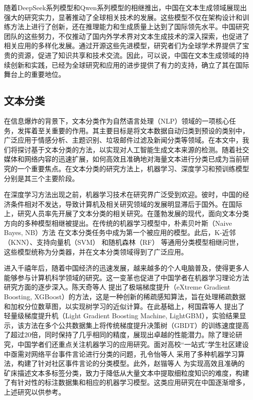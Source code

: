 随着DeepSeek系列模型和Qwen系列模型的相继推出，中国在文本生成领域展现出强大的研究实力，显著推动了全球相关技术的发展。这些模型不仅在架构设计和训练方法上进行了创新，还在推理能力和生成质量上达到了国际领先水平。中国研究团队的这些努力，不仅推动了国内外学术界对文本生成技术的深入探索，也促进了相关应用的多样化发展。通过开源这些先进模型，研究者们为全球学术界提供了宝贵的资源，促进了知识共享和技术交流。因此，可以说，中国在文本生成领域的持续创新和实践，已经为全球研究和应用的进步提供了有力的支持，确立了其在国际舞台上的重要地位。

\subsection{文本分类}
\label{sec:intro-inout-textclassify}


在信息爆炸的背景下，文本分类作为自然语言处理（NLP）领域的一项核心任务，发挥着至关重要的作用。其主要目标是将文本数据自动归类到预设的类别中，广泛应用于情感分析、主题识别、垃圾邮件过滤及新闻分类等领域。在本文中，我们将探讨基于文本分类的方法，以实现对人工智能生成文本来源的检测。随着社交媒体和网络内容的迅速扩展，如何高效且准确地对海量文本进行分类已成为当前研究的一个重要焦点。在文本分类的研究方法上，机器学习、深度学习和预训练模型分别是其三个主要阶段。

在深度学习方法出现之前，机器学习技术在研究界广泛受到欢迎。彼时，中国的经济条件相对不发达，导致计算机及相关研究领域的发展明显滞后于国外。在国际上，研究人员率先开展了文本分类的相关研究。在蓬勃发展的现代，面向文本分类方向的多种模型相继被提出。在传统的机器学习模型中，朴素贝叶斯（Naive Bayes, NB）方法 \cite{Maron1961AutomaticIA} 在文本分类任务中成为第一个被应用的模型。此后，K-近邻（KNN）\cite{Cover1967NearestNP}、支持向量机（SVM）\cite{Joachims1999TextCW} 和随机森林（RF）\cite{Breiman2001RandomF} 等通用分类模型相继问世，这些模型统称为分类器，并在文本分类领域得到了广泛应用。

进入千禧年后，随着中国经济的迅速发展，越来越多的个人电脑普及，使得更多人能够参与计算机科学领域的研究。这一变革也促进了中国学者在机器学习理论方法研究方面的逐步深入。陈天奇等人\cite{Chen2016XGBoostAS} 提出了极端梯度提升（eXtreme Gradient Boosting, XGBoost）的方法，这是一种创新的稀疏感知算法，旨在处理稀疏数据和加权分位数草图，以实现树学习的近似计算。在此基础上，柯国霖等人\cite{Ke2017LightGBMAH} 提出了轻量级梯度提升机（Light Gradient Boosting Machine, LightGBM），实验结果显示，该方法在多个公共数据集上将传统梯度提升决策树（GBDT）的训练速度提高了超过20倍，同时保持了几乎相同的精度，展现出卓越的性能潜力。除了理论研究，中国学者们还重点关注机器学习的应用研究。面对高校“一站式”学生社区建设中亟需对网络平台事件言论进行分类的问题，孔令怡等人\cite{XDJS202421019} 采用了多种机器学习算法，构建了针对社区事件言论的分类模型。此外，赵锴等人\cite{ZGKA202410022} 为实现高效且准确的矿床描述文本多标签分类，致力于降低从大量文本中提取细粒度知识的难度，构建了有针对性的标注数据集和相应的机器学习模型。这类应用研究在中国逐渐增多，上述研究以供参考。

